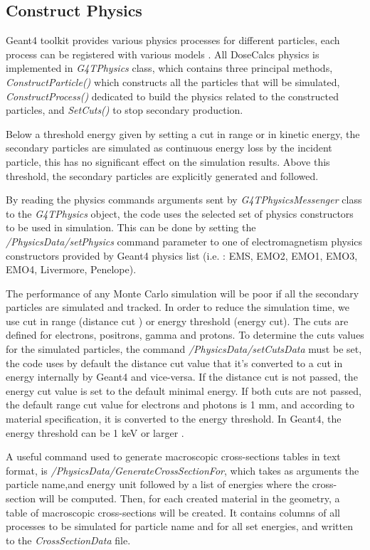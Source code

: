 \documentclass[letterpaper,12pt]{article}
\begin{document}
\subsection{Construct Physics}

Geant4 toolkit provides various physics processes for different particles, each process can be registered with various models \cite{PhysicsRefGuide}.
All DoseCalcs physics is implemented in \textit{G4TPhysics} class, which contains three principal methods, \textit{ConstructParticle()} which constructs all the particles that will be simulated, \textit{ConstructProcess()} dedicated to build the physics related to the constructed particles, and \textit{SetCuts()} to stop secondary production.

Below a threshold energy given by setting a cut in range or in kinetic energy, the secondary particles are simulated as continuous energy loss by the incident particle, this has no significant effect on the simulation results. Above this threshold, the secondary particles are explicitly generated and followed.

By reading the physics commands arguments sent by \textit{G4TPhysicsMessenger} class to the \textit{G4TPhysics} object, the code uses the selected set of physics constructors to be used in simulation. This can be done by setting the \textit{/PhysicsData/setPhysics} command parameter to one of electromagnetism physics constructors provided by Geant4 physics list (i.e. : EMS, EMO2, EMO1, EMO3, EMO4, Livermore, Penelope).

The performance of any Monte Carlo simulation will be poor if all the secondary particles are simulated and tracked. In order to reduce the simulation time, we use cut in range (distance cut ) or energy threshold (energy cut). The cuts are defined for electrons, positrons, gamma and protons. To determine the cuts values for the simulated particles, the command \textit{/PhysicsData/setCutsData} must be set, the code uses by default the distance cut value that it's converted to a cut in energy internally by Geant4 and vice-versa\cite{PhysicsRefGuide}. If the distance cut is not passed, the energy cut value is set to the default minimal energy. If both cuts are not passed, the default range cut value for electrons and photons is 1 mm, and according to material specification, it is converted to the energy threshold. In Geant4, the energy threshold can be 1 keV or larger \cite{PhysicsRefGuide}.

A useful command used to generate macroscopic cross-sections tables in text format, is \textit{/PhysicsData/GenerateCrossSectionFor}, which takes as arguments the particle name,and energy unit followed by a list of energies where the cross-section will be computed. Then, for each created material in the geometry, a table of macroscopic cross-sections will be created. It contains columns of all processes to be simulated for particle name and for all set energies, and written to the \textit{CrossSectionData} file.
\end{document}
